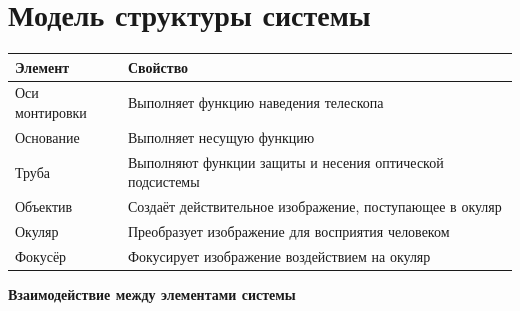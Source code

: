 \section{Модель структуры системы}

\begin{center}
\begin{tabular}{ | m{3.5cm} | m{10cm}| }  
  \hline
  \textbf{Элемент}& \textbf{Свойство}\\
  \hline
  Оси монтировки& Выполняет функцию наведения телескопа\\
  \hline
  Основание& Выполняет несущую функцию\\
  \hline
  Труба& Выполняют функции защиты и несения оптической подсистемы\\
  \hline
  Объектив& Создаёт действительное изображение, поступающее в окуляр\\
  \hline
  Окуляр& Преобразует изображение для восприятия человеком\\
  \hline
  Фокусёр& Фокусирует изображение воздействием на окуляр\\
  \hline
\end{tabular}
\end{center}

\textbf{Взаимодействие между элементами системы}


